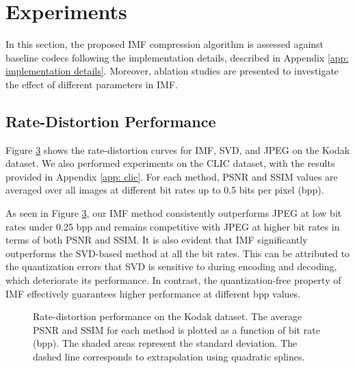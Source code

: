 \section{Experiments} \label{sec: experiments}

In this section, the proposed IMF compression algorithm is assessed against baseline codecs following the implementation details, described in Appendix \ref{app: implementation details}. Moreover, ablation studies are presented to investigate the effect of different parameters in IMF.

\subsection{Rate-Distortion Performance} \label{sec: rate_distortion_performance}

Figure \ref{fig: rate-distortion kodak} shows the rate-distortion curves for IMF, SVD, and JPEG on the Kodak dataset. We also performed experiments on the CLIC dataset, with the results provided in Appendix \ref{app: clic}. For each method, PSNR and SSIM values are averaged over all images at different bit rates up to 0.5 bits per pixel (bpp). 

As seen in Figure \ref{fig: rate-distortion kodak}, our IMF method consistently outperforms JPEG at low bit rates under 0.25 bpp and remains competitive with JPEG at higher bit rates in terms of both PSNR and SSIM. It is also evident that IMF significantly outperforms the SVD-based method at all the bit rates. This can be attributed to the quantization errors that SVD is sensitive to during encoding and decoding, which deteriorate its performance. In contrast, the quantization-free property of IMF effectively guarantees higher performance at different bpp values.

\begin{figure}[t]
	\centering
	\begin{subfigure}{.5\textwidth}
		\centering
		\resizebox{.95\textwidth}{!}{}
		\caption{}
		\label{fig: psnr-vs-bpp kodak}
	\end{subfigure}%
	\begin{subfigure}{.5\textwidth}
		\centering
		\resizebox{.95\textwidth}{!}{}
		\caption{}
		\label{fig: ssim-vs-bpp kodak}
	\end{subfigure}
	\caption{Rate-distortion performance on the Kodak dataset. The average PSNR and SSIM for each method is plotted as a function of bit rate (bpp). The shaded areas represent the standard deviation. The dashed line corresponds to extrapolation using quadratic splines.}
	\label{fig: rate-distortion kodak}
\end{figure}


